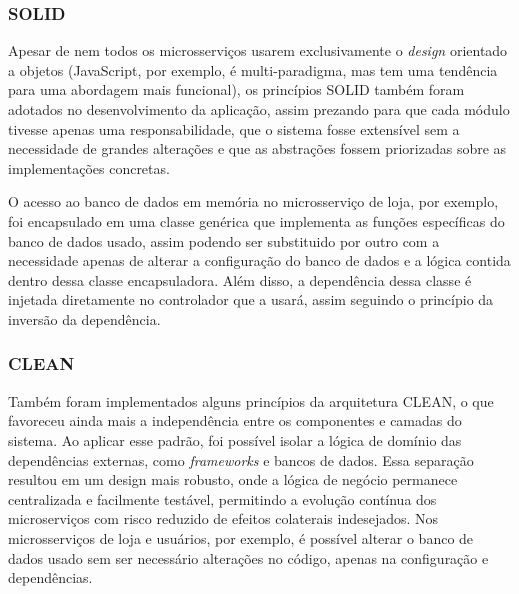 \subsubsection*{SOLID}
Apesar de nem todos os microsserviços usarem exclusivamente o \emph{design} orientado a objetos (JavaScript, por exemplo, é multi-paradigma, mas tem uma tendência para uma abordagem mais funcional), os princípios SOLID também foram adotados no desenvolvimento da aplicação, assim prezando para que cada módulo tivesse apenas uma responsabilidade, que o sistema fosse extensível sem a necessidade de grandes alterações e que as abstrações fossem priorizadas sobre as implementações concretas.

O acesso ao banco de dados em memória no microsserviço de loja, por exemplo, foi encapsulado em uma classe genérica que implementa as funções específicas do banco de dados usado, assim podendo ser substituido por outro com a necessidade apenas de alterar a configuração do banco de dados e a lógica contida dentro dessa classe encapsuladora. Além disso, a dependência dessa classe é injetada diretamente no controlador que a usará, assim seguindo o princípio da inversão da dependência.


\subsubsection*{CLEAN}
Também foram implementados alguns princípios da arquitetura CLEAN, o que favoreceu ainda mais a independência entre os componentes e camadas do sistema. Ao aplicar esse padrão, foi possível isolar a lógica de domínio das dependências externas, como \emph{frameworks} e bancos de dados. Essa separação resultou em um design mais robusto, onde a lógica de negócio permanece centralizada e facilmente testável, permitindo a evolução contínua dos microserviços com risco reduzido de efeitos colaterais indesejados.
Nos microsserviços de loja e usuários, por exemplo, é possível alterar o banco de dados usado sem ser necessário alterações no código, apenas na configuração e dependências.

